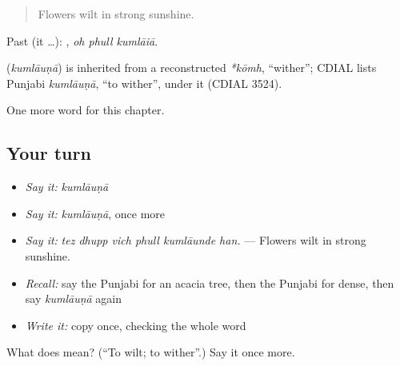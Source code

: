 \begin{quote}
Flowers wilt in strong sunshine.
\end{quote}

Past (it …):   , \emph{oh phull kumlāiā}.

\begin{cousinweb}
\textbf{} (\emph{kumlāuṇā}) is inherited from a reconstructed \emph{*kōmh}, \textquotedblleft{}wither\textquotedblright{}; CDIAL lists Punjabi \emph{kumlāuṇā}, \textquotedblleft{}to wither\textquotedblright{}, under it (CDIAL 3524).
\end{cousinweb}

\begin{grammarlens}[title={What you've built}]
One more word for this chapter.
\end{grammarlens}

\subsection*{Your turn}
\begin{itemize}
\raggedright
  \item \emph{Say it:} \emph{kumlāuṇā}
  \item \emph{Say it:} \emph{kumlāuṇā}, once more
  \item \emph{Say it:} \emph{tez dhupp vich phull kumlāunde han.} — Flowers wilt in strong sunshine.
  \item \emph{Recall:} say the Punjabi for an acacia tree, then the Punjabi for dense, then say \emph{kumlāuṇā} again
  \item \emph{Write it:} copy \textbf{} once, checking the whole word
\end{itemize}

\begin{tcolorbox}[breakable,colback=teal!4,colframe=teal!35!black,title={Before you move on}]
What does  mean? (\textquotedblleft{}To wilt; to wither\textquotedblright{}.) Say it once more.
\end{tcolorbox}
